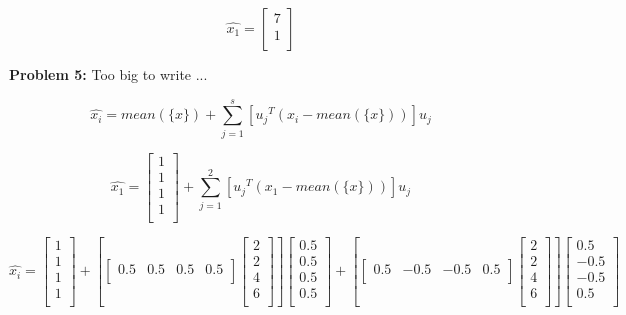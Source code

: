 \documentclass{article}
\begin{document}
 \[\hat{x_1}=
 \begin{bmatrix}
     7 \\
     1 \\
 \end{bmatrix}
 \]
 
 \newpage
 
 
 \begin{center}
     \Large\textbf{Problem 5:} Too big to write ... \par
 \end{center}
 
 \[\hat{x_i}=mean(\{x\})+\sum_{j=1}^{s}[{u_j}^T(x_i-mean(\{x\}))]u_j\]
 
 \[\hat{x_1}=
 \begin{bmatrix}
     1 \\
     1 \\
     1 \\
     1 \\
 \end{bmatrix}
 +\sum_{j=1}^{2}[{u_j}^T(x_1-mean(\{x\}))]u_j\]
 
 \[\hat{x_i}=
 \begin{bmatrix}
     1 \\
     1 \\
     1 \\
     1 \\
 \end{bmatrix}
 +[
 \begin{bmatrix}
     0.5 & 0.5 & 0.5 & 0.5 \\
 \end{bmatrix}
 \begin{bmatrix}
     2 \\
     2 \\
     4 \\
     6 \\
 \end{bmatrix}
 ]
 \begin{bmatrix}
     0.5 \\
     0.5 \\
     0.5 \\
     0.5 \\
 \end{bmatrix}
 +
 [
 \begin{bmatrix}
     0.5 & -0.5 & -0.5 & 0.5 \\
 \end{bmatrix}
 \begin{bmatrix}
     2 \\
     2 \\
     4 \\
     6 \\
 \end{bmatrix}
 ]
 \begin{bmatrix}
     0.5 \\
     -0.5 \\
     -0.5 \\
     0.5 \\
 \end{bmatrix}
 \]
 
\end{document}
